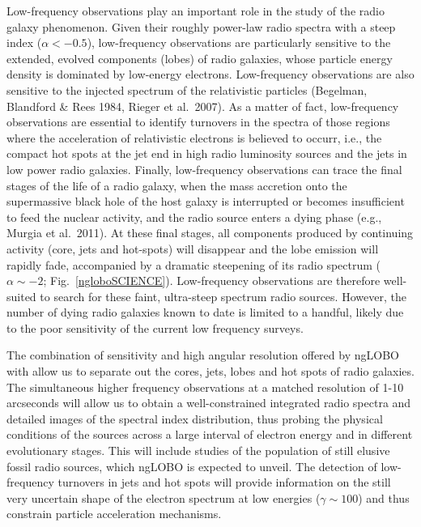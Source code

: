 \documentclass[11pt]{article}
\begin{document}
Low-frequency observations play an important role in the study of the radio galaxy phenomenon. 
Given their roughly power-law radio spectra with a steep index ($\alpha < -0.5$), low-frequency 
observations are particularly sensitive to the extended, evolved components (lobes) of radio galaxies, 
whose particle energy density is dominated by low-energy electrons. Low-frequency observations 
are also sensitive to the injected spectrum of the relativistic particles (Begelman, Blandford \& Rees 1984, 
Rieger et al.\ 2007). As a matter of fact, low-frequency observations are essential to identify 
turnovers in the spectra of those regions where the acceleration of relativistic electrons is 
believed to occurr, i.e., the compact hot spots at the jet end in high radio luminosity sources and the jets in low power radio galaxies. Finally, low-frequency observations can trace the final stages of the life of a radio galaxy, when the mass accretion onto the supermassive black hole of the host galaxy is interrupted or becomes insufficient to feed the nuclear activity, and the radio source enters a dying phase (e.g., Murgia et al.\ 2011). At these final stages, all components produced by continuing activity (core, jets and hot-spots) will disappear and the lobe emission will rapidly fade, accompanied by a dramatic steepening of its radio spectrum ($\alpha \sim -2$; 
Fig.~\ref{ngloboSCIENCE}). Low-frequency observations are therefore well-suited 
to search for these faint, ultra-steep spectrum radio sources. However, the number of dying radio galaxies known to date is limited to a handful, likely due to the poor sensitivity of the current low frequency surveys. 

The combination of sensitivity and high angular resolution offered by ngLOBO with allow 
us to separate out the cores, jets, lobes and hot spots of radio galaxies. The simultaneous 
higher frequency observations at a matched resolution of 1-10 arcseconds will allow us to 
obtain a well-constrained integrated radio spectra and detailed images of the spectral index distribution, thus probing the physical conditions of the sources across a large interval
of electron energy and in different evolutionary stages. This will include studies of 
the population of still elusive fossil radio sources, which ngLOBO is expected to 
unveil. The detection of low-frequency turnovers in jets and hot spots will 
provide information on the still very uncertain shape of the electron spectrum at low 
energies ($\gamma \sim 100$) and thus constrain particle acceleration mechanisms. 
\end{document}
